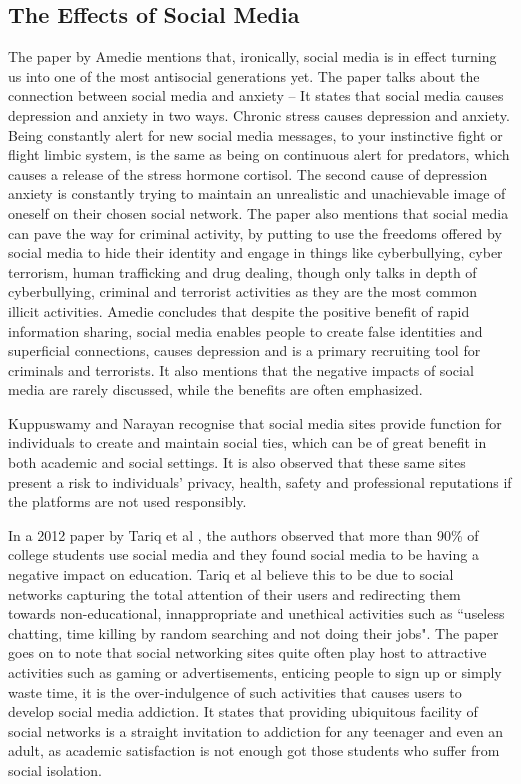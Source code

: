 \documentclass[lettersize,journal]{IEEEtran}
\begin{document}
\subsection{The Effects of Social Media}
    The paper by Amedie \cite{Amedie 2015} mentions that, ironically, social
    media is in effect turning us into one of the most antisocial generations
    yet. The paper talks about the connection between social media and anxiety
    – It states that social media causes depression and anxiety in two ways. Chronic
    stress causes depression and anxiety. Being constantly alert for new social
    media messages, to your instinctive fight or flight limbic system, is the
    same as being on continuous alert for predators, which causes a release of
    the stress hormone cortisol. The second cause of depression anxiety is
    constantly trying to maintain an unrealistic and unachievable image of
    oneself on their chosen social network. The paper also mentions
    that social media can pave the way for criminal activity, by putting to use
    the freedoms offered by social media to hide their identity and engage in
    things like cyberbullying, cyber terrorism, human trafficking and drug dealing,
    though only talks in depth of cyberbullying, criminal and terrorist activities
    as they are the most common illicit activities. Amedie concludes that despite
    the positive benefit of rapid information sharing, social media enables people
    to create false identities and superficial connections, causes depression and
    is a primary recruiting tool for criminals and terrorists. It also mentions
    that the negative impacts of social media are rarely discussed, while the benefits
    are often emphasized.

    Kuppuswamy and Narayan \cite{Kuppuswamy et al 2010} recognise that social
    media sites provide function for individuals to create and maintain social
    ties, which can be of great benefit in both academic and social settings.
    It is also observed that these same sites present a risk to individuals'
    privacy, health, safety and professional reputations if the platforms are
    not used responsibly.

    In a 2012 paper by Tariq et al \cite{Tariq et al 2012}, the authors observed that more than 90\%
    of college students use social media \cite{Ellison et al 2007} and they found social media to be
    having a negative impact on education. Tariq et al believe this to be due to social networks
    capturing the total attention of their users and redirecting them towards non-educational, innappropriate
    and unethical activities such as ``useless chatting, time killing by random searching and not doing their jobs". The paper
    goes on to note that social networking sites quite often play host to attractive activities such
    as gaming or advertisements, enticing people to sign up or simply waste time, it is the over-indulgence
    of such activities that causes users to develop social media addiction. It states that providing ubiquitous
    facility of social networks is a straight invitation to addiction for any teenager and even an adult, as
    academic satisfaction is not enough got those students who suffer from social isolation\cite{Pempek et al 2009}.   
\end{document}
